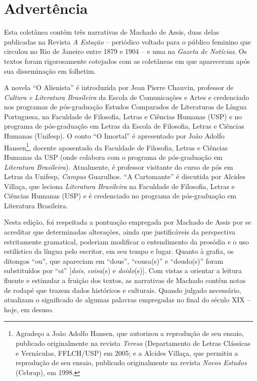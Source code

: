 \chapter{Advertência}

Esta coletânea contém três narrativas de Machado de Assis, duas delas
publicadas na Revista \emph{A Estação} -- periódico voltado para o
público feminino que circulou no Rio de Janeiro entre 1879 e 1904 -- e
uma na \emph{Gazeta de Notícias}. Os textos foram rigorosamente
cotejados com as coletâneas em que apareceram após sua disseminação em
folhetim.

A novela ``O Alienista'' é introduzida por Jean Pierre Chauvin,
professor de \emph{Cultura e Literatura Brasileira} da Escola de
Comunicações e Artes e credenciado nos programas de pós-graduação
Estudos Comparados de Literaturas de Língua Portuguesa, na Faculdade de
Filosofia, Letras e Ciências Humanas (USP) e no programa de
pós-graduação em Letras da Escola de Filosofia, Letras e Ciências
Humanas (Unifesp). O conto ``O Imortal'' é apresentado por João Adolfo
Hansen\footnote{Agradeço a João Adolfo Hansen, que autorizou a
  reprodução de seu ensaio, publicado originalmente na revista
  \emph{Teresa} (Departamento de Letras Clássicas e Vernáculas,
  FFLCH/USP) em 2005; e a Alcides Villaça, que permitiu a reprodução de
  seu ensaio, publicado originalmente na revista \emph{Novos Estudos}
  (Cebrap), em 1998.}, docente aposentado da Faculdade de Filosofia,
Letras e Ciências Humanas da USP (onde colabora com o programa de
pós-graduação em \emph{Literatura Brasileira}). Atualmente, é professor
visitante do curso de pós em Letras da Unifesp, \emph{Campus} Guarulhos.
``A Cartomante'' é discutida por Alcides Villaça, que leciona
\emph{Literatura Brasileira} na Faculdade de Filosofia, Letras e
Ciências Humanas (USP) e é credenciado no programa de pós-graduação em
Literatura Brasileira.

Nesta edição, foi respeitada a pontuação empregada por Machado de Assis
por se acreditar que determinadas alterações, ainda que justificáveis da
perspectiva estritamente gramatical, poderiam modificar o entendimento
da prosódia e o uso estilístico da língua pelo escritor, em seu tempo e
lugar. Quanto à grafia, os ditongos ``ou'', que apareciam em ``dous'',
``cousa(s)'' e ``doudo(s)'' foram substituídos por ``oi''
{[}\emph{dois}, \emph{coisa}(s) e \emph{doido}(s){]}. Com vistas a
orientar a leitura fluente e estimular a fruição dos textos, as
narrativas de Machado contêm notas de rodapé que trazem dados históricos
e culturais. Quando julgado necessário, atualizam o significado de
algumas palavras empregadas no final do século XIX -- hoje, em desuso.

